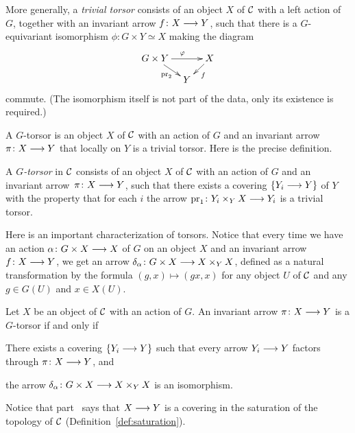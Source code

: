 \begin{4   STACKS}
\begin{4.4 Descent along torsors}
More generally, a \emph{trivial torsor}%
%
 consists of an object $X$ of $\mathcal{C}$ with a left action of $G$, together with an invariant arrow $f \colon X \arr Y$, such that there is a $G$-equivariant isomorphism $\phi \colon G \times Y \simeq X$ making the diagram
   \[
   \xymatrix@-15pt{
   G \times Y\ar[rr]^{\phi} \ar[rd]_-{\pr_2} &&
   X \ar[ld]^f \\
   & Y
   }
   \]
commute. (The isomorphism itself is not part of the data, only its existence is required.)

A $G$-torsor is an object $X$ of $\mathcal{C}$ with an action of $G$ and an invariant arrow\ $\pi\colon X \arr Y$ that locally on $Y$ is a trivial torsor. Here is the precise definition.

\begin{definition}
A \emph{$G$-torsor}%
 in $\mathcal{C}$ consists of an object $X$ of $\mathcal{C}$ with an action of $G$ and an invariant arrow\ $\pi \colon X \arr Y$, such that there exists a covering $\{Y_i \arr Y\}$ of $Y$ with the property that for each $i$ the arrow $\pr_1 \colon Y_i \times_Y X \arr Y_i$ is a trivial torsor.
\end{definition}

Here is an important characterization of torsors. Notice that every time we have an action $\alpha \colon G \times X \arr X$ of $G$ on an object $X$ and an invariant arrow $f \colon X \arr Y$, we get an arrow $\delta_\alpha \colon G \times X \arr X \times_Y X$, defined as a natural transformation by the formula $(g, x) \mapsto (gx, x)$ for any object $U$ of $\mathcal{C}$ and any $g \in G(U)$ and $x \in X(U)$.

\begin{proposition}
Let $X$ be an object of $\mathcal{C}$ with an action of $G$. An invariant arrow $\pi \colon X \arr Y$ is a $G$-torsor if and only if

\begin{enumeratei}

 There exists a covering $\{Y_i \arr Y\}$ such that every arrow $Y_i \arr Y$ factors through $\pi \colon X \arr Y$, and

 the arrow $\delta_\alpha \colon G \times X \arr X \times_Y X$ is an isomorphism.

\end{enumeratei}
\end{proposition}

Notice that part~ says that $X \arr Y$ is a covering in the saturation of the topology of $\mathcal{C}$ (Definition~\ref{def:saturation}).


\end{4.4 Descent along torsors}
\end{4   STACKS}
